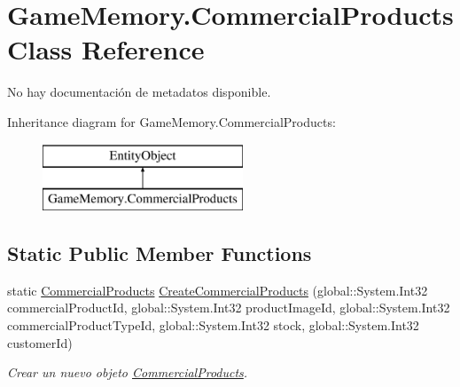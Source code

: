 \hypertarget{class_game_memory_1_1_commercial_products}{\section{Game\-Memory.\-Commercial\-Products Class Reference}
\label{class_game_memory_1_1_commercial_products}
}


No hay documentación de metadatos disponible.  


Inheritance diagram for Game\-Memory.\-Commercial\-Products\-:\begin{figure}[H]
\begin{center}
\leavevmode
\includegraphics[height=2.000000cm]{class_game_memory_1_1_commercial_products}
\end{center}
\end{figure}
\subsection*{Static Public Member Functions}
\begin{DoxyCompactItemize}
\item 
static \hyperlink{class_game_memory_1_1_commercial_products}{Commercial\-Products} \hyperlink{class_game_memory_1_1_commercial_products_a7281abea1810474d171d7d936bb0069c}{Create\-Commercial\-Products} (global\-::\-System.\-Int32 commercial\-Product\-Id, global\-::\-System.\-Int32 product\-Image\-Id, global\-::\-System.\-Int32 commercial\-Product\-Type\-Id, global\-::\-System.\-Int32 stock, global\-::\-System.\-Int32 customer\-Id)
\begin{DoxyCompactList}\small\item\em Crear un nuevo objeto \hyperlink{class_game_memory_1_1_commercial_products}{Commercial\-Products}. \end{DoxyCompactList}\end{DoxyCompactItemize}
